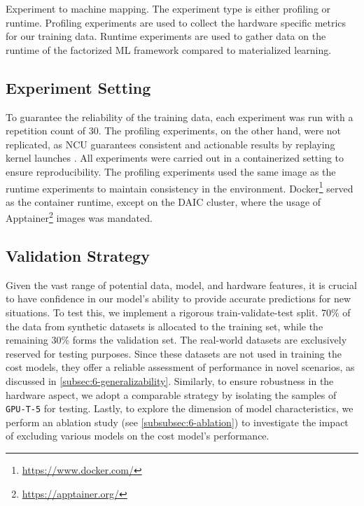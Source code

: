 \begin{table}[ht]
  \centering
  
  \caption[Experiment to machine mapping]{Experiment to machine mapping. The experiment type is either profiling or runtime. Profiling experiments are used to collect the hardware specific metrics for our training data. Runtime experiments are used to gather data on the runtime of the factorized ML framework compared to materialized learning.}
  \label{tab:6-hardware-overview}
\end{table}

\subsection{Experiment Setting}
To guarantee the reliability of the training data, each experiment was run with a repetition count of $30$. The profiling experiments, on the other hand, were not replicated, as NCU guarantees consistent and actionable results by replaying kernel launches \cite{nsight_compute}. All experiments were carried out in a containerized setting to ensure reproducibility. The profiling experiments used the same image as the runtime experiments to maintain consistency in the environment. Docker\footnote{\url{https://www.docker.com/}} served as the container runtime, except on the DAIC cluster, where the usage of Apptainer\footnote{\url{https://apptainer.org/}} images was mandated.

\subsection{Validation Strategy}
\label{subsec:6-validation-strategy}
Given the vast range of potential data, model, and hardware features, it is crucial to have confidence in our model's ability to provide accurate predictions for new situations. To test this, we implement a rigorous train-validate-test split. $70\%$ of the data from synthetic datasets is allocated to the training set, while the remaining $30\%$ forms the validation set. The real-world datasets are exclusively reserved for testing purposes. Since these datasets are not used in training the cost models, they offer a reliable assessment of performance in novel scenarios, as discussed in \autoref{subsec:6-generalizability}. Similarly, to ensure robustness in the hardware aspect, we adopt a comparable strategy by isolating the samples of \texttt{GPU-T-5} for testing. Lastly, to explore the dimension of model characteristics, we perform an ablation study (see \autoref{subsubsec:6-ablation}) to investigate the impact of excluding various models on the cost model's performance.


